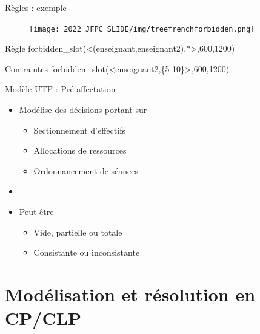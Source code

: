 \documentclass{beamer}
\begin{document}
\begin{frame}{Règles : exemple}
    \begin{figure}
        \centering
        \texttt{[image: 2022\_JFPC\_SLIDE/img/treefrenchforbidden.png]}
        \label{fig:rules2}
    \end{figure}
    \begin{minipage}{0.45\textwidth}
    
    \begin{block}{\tiny Règle}
             {\tiny forbidden\_slot(<(enseignant,enseignant2),*>,600,1200)}
\end{block}
    \end{minipage}
    \hfill
    \begin{minipage}{0.45\textwidth}
    \begin{alertblock}{\tiny Contraintes}
        {\tiny forbidden\_slot(<enseignant2,\{5-10\}>,600,1200)   }

    \end{alertblock}
    \end{minipage}
\end{frame}



\begin{frame}{Modèle UTP : Pré-affectation}
    \begin{itemize}
        \item Modélise des décisions portant sur
        \begin{itemize}
            \item Sectionnement d'effectifs
            \item Allocations de ressources
            \item Ordonnancement de séances
        \end{itemize}
        
        \item[]
        \item Peut être 
        \begin{itemize}
            \item Vide, partielle ou totale
            \item Consistante ou inconsistante
        \end{itemize}
    \end{itemize}
\end{frame}
\section{Modélisation et résolution en CP/CLP}
\end{document}
